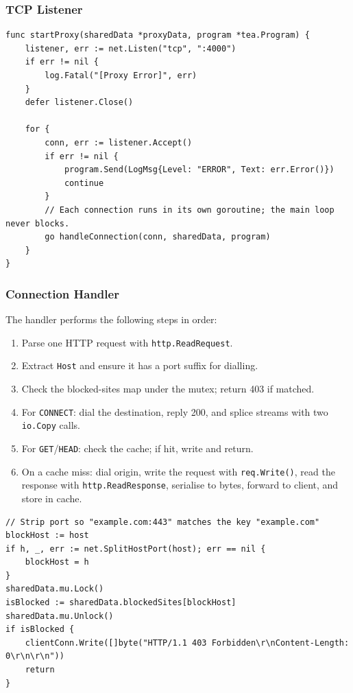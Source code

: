 \documentclass[11pt,a4paper]{article}
\begin{document}
\subsubsection{TCP Listener}

\begin{lstlisting}[caption={Accepting connections and spawning goroutines.}]
func startProxy(sharedData *proxyData, program *tea.Program) {
    listener, err := net.Listen("tcp", ":4000")
    if err != nil {
        log.Fatal("[Proxy Error]", err)
    }
    defer listener.Close()

    for {
        conn, err := listener.Accept()
        if err != nil {
            program.Send(LogMsg{Level: "ERROR", Text: err.Error()})
            continue
        }
        // Each connection runs in its own goroutine; the main loop never blocks.
        go handleConnection(conn, sharedData, program)
    }
}
\end{lstlisting}

\subsubsection{Connection Handler}

The handler performs the following steps in order:

\begin{enumerate}
  \item Parse one HTTP request with \texttt{http.ReadRequest}.
  \item Extract \texttt{Host} and ensure it has a port suffix for dialling.
  \item Check the blocked-sites map under the mutex; return 403 if matched.
  \item For \texttt{CONNECT}: dial the destination, reply 200, and splice
    streams with two \texttt{io.Copy} calls.
  \item For \texttt{GET}/\texttt{HEAD}: check the cache; if hit, write and return.
  \item On a cache miss: dial origin, write the request with
    \texttt{req.Write()}, read the response with \texttt{http.ReadResponse},
    serialise to bytes, forward to client, and store in cache.
\end{enumerate}

\begin{lstlisting}[caption={Blocking check (proxy.go).}]
// Strip port so "example.com:443" matches the key "example.com"
blockHost := host
if h, _, err := net.SplitHostPort(host); err == nil {
    blockHost = h
}
sharedData.mu.Lock()
isBlocked := sharedData.blockedSites[blockHost]
sharedData.mu.Unlock()
if isBlocked {
    clientConn.Write([]byte("HTTP/1.1 403 Forbidden\r\nContent-Length: 0\r\n\r\n"))
    return
}
\end{lstlisting}
\end{document}
